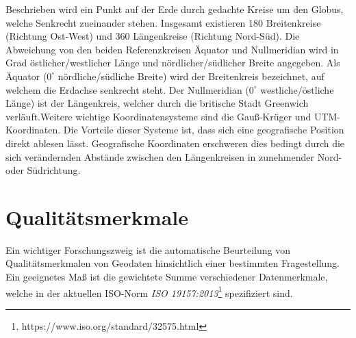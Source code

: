 \documentclass[11pt,ceqn]{book}
\begin{document}
Beschrieben wird ein Punkt auf der Erde durch gedachte Kreise um den Globus, welche Senkrecht zueinander stehen. Insgesamt existieren 180 Breitenkreise (Richtung Ost-West) und 360 Längenkreise (Richtung Nord-Süd). Die Abweichung von den beiden Referenzkreisen Äquator und Nullmeridian wird in Grad östlicher/westlicher Länge und nördlicher/südlicher Breite angegeben. Als Äquator ($0^\circ$ nördliche/südliche Breite) wird der Breitenkreis bezeichnet, auf welchem die Erdachse senkrecht steht. Der Nullmeridian ($0^\circ$ westliche/östliche Länge) ist der Längenkreis, welcher durch die britische Stadt Greenwich verläuft.\newline Weitere wichtige Koordinatensysteme sind die Gauß-Krüger und UTM-Koordinaten. Die Vorteile dieser Systeme ist, dass sich eine geografische Position direkt ablesen lässt. Geografische Koordinaten erschweren dies bedingt durch die sich verändernden Abstände zwischen den Längenkreisen in zunehmender Nord- oder Südrichtung.


\section{Qualitätsmerkmale}
Ein wichtiger Forschungszweig ist die automatische Beurteilung von Qualitätsmerkmalen von Geodaten hinsichtlich einer bestimmten Fragestellung.
Ein geeignetes Maß ist die gewichtete Summe verschiedener Datenmerkmale, welche in der aktuellen ISO-Norm \textit{ISO 19157:2013}\footnote{https://www.iso.org/standard/32575.html} spezifiziert sind.
\end{document}
